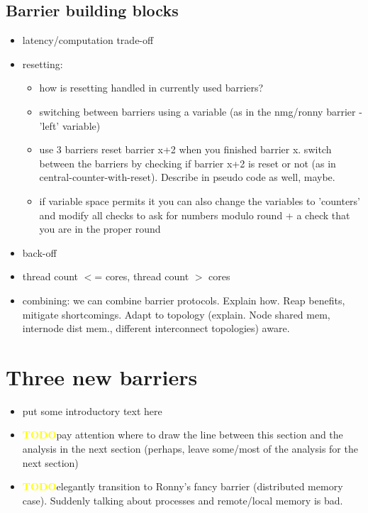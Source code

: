 \documentclass[a4paper, 10pt]{article}
\def \todo{\textbf{\textcolor{yellow}{TODO}}}
\begin{document}
\begin{enumerate}
\subsection{Barrier building blocks}
\label{ssec:building-blocks}
\begin{itemize}
	\item latency/computation trade-off
	\item resetting:
		\begin{itemize}
			\item how is resetting handled in currently used barriers?
			\item switching between barriers using a variable (as in the nmg/ronny barrier - 'left' variable)
			\item use 3 barriers reset barrier x+2 when you finished barrier x. switch between the barriers by checking if barrier x+2 is reset or not (as in central-counter-with-reset). Describe in pseudo code as well, maybe.
			\item if variable space permits it you can also change the variables to 'counters' and modify all checks to ask for numbers modulo round + a check that you are in the proper round
		\end{itemize}
	\item back-off
	\item thread count $<$= cores, thread count $>$ cores
	\item combining: we can combine barrier protocols. Explain how. Reap benefits, mitigate shortcomings. Adapt to topology (explain. Node shared mem, internode dist mem., different interconnect topologies) aware.
\end{itemize}

\section{Three new barriers}
\label{sec:new}
\begin{itemize}
	\item put some introductory text here
	\item \todo pay attention where to draw the line between this section and the analysis in the next section (perhaps, leave some/most of the analysis for the next section)
	\item \todo elegantly transition to Ronny's fancy barrier (distributed memory case). Suddenly talking about processes and remote/local memory is bad.
\end{itemize}

\end{enumerate}
\end{document}
